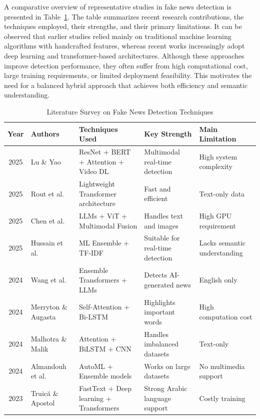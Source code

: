 \documentclass[conference]{IEEEtran}
\begin{document}
A comparative overview of representative studies in fake news detection is presented in Table~\ref{tab:lit_survey}. The table summarizes recent research contributions, the techniques employed, their strengths, and their primary limitations. It can be observed that earlier studies relied mainly on traditional machine learning algorithms with handcrafted features, whereas recent works increasingly adopt deep learning and transformer-based architectures. Although these approaches improve detection performance, they often suffer from high computational cost, large training requirements, or limited deployment feasibility. This motivates the need for a balanced hybrid approach that achieves both efficiency and semantic understanding.

\begin{table}[H]
\centering
\caption{Literature Survey on Fake News Detection Techniques}
\label{tab:lit_survey}
\renewcommand{\arraystretch}{1.25}
\begin{tabular}{|c|l|p{4cm}|p{3cm}|p{4cm}|}
\hline
\textbf{Year} & \textbf{Authors} & \textbf{Techniques Used} & \textbf{Key Strength} & \textbf{Main Limitation} \\
\hline
2025 & Lu \& Yao & ResNet + BERT + Attention + Video DL & Multimodal real-time detection & High system complexity \\
\hline
2025 & Rout et al. & Lightweight Transformer architecture & Fast and efficient & Text-only data \\
\hline
2025 & Chen et al. & LLMs + ViT + Multimodal Fusion & Handles text and images & High GPU requirement \\
\hline
2025 & Hussain et al. & ML Ensemble + TF-IDF & Suitable for real-time detection & Lacks semantic understanding \\
\hline
2024 & Wang et al. & Ensemble Transformers + LLMs & Detects AI-generated news & English only \\
\hline
2024 & Merryton \& Augasta & Self-Attention + Bi-LSTM & Highlights important words & High computation cost \\
\hline
2024 & Malhotra \& Malik & Attention + BiLSTM + CNN & Handles imbalanced datasets & Text-only \\
\hline
2024 & Almandouh et al. & AutoML + Ensemble models & Works on large datasets & No multimedia support \\
\hline
2023 & Truică \& Apostol & FastText + Deep learning + Transformers & Strong Arabic language support & Costly training \\
\hline

\end{tabular}
\end{table}
\end{document}
